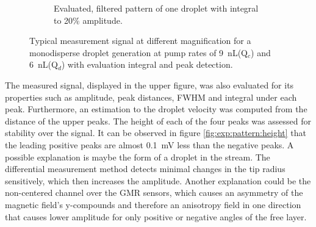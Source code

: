 \begin{figure}[h]
\begin{subfigure}[r]{.49\textwidth}
	\caption{Evaluated, filtered pattern of one droplet with integral to 20\% amplitude.}
	\label{fig:exp:pattern:raw}
\end{subfigure}
	\caption{Typical measurement signal at different magnification for a monodisperse droplet generation at pump rates of \SI{9}{\nano\liter}(Q$_c$) and \SI{6}{\nano\liter}(Q$_d$) with evaluation integral and peak detection.}
\end{figure}

The measured signal, displayed in the upper figure, was also evaluated for its properties such as amplitude, peak distances, FWHM and integral under each peak. Furthermore, an estimation to the droplet velocity was computed from the distance of the upper peaks. The height of each of the four peaks was assessed for stability over the signal. It can be observed in figure \ref{fig:exp:pattern:height} that the leading positive peaks are almost \SI{0.1}{\mV} less than the negative peaks. A possible explanation is maybe the form of a droplet in the stream. The differential measurement method detects minimal changes in the tip radius sensitively, which then increases the amplitude. Another explanation could be the non-centered channel over the GMR sensors, which causes an asymmetry of the magnetic field's y-compounds and therefore an anisotropy field in one direction that causes lower amplitude for only positive or negative angles of the free layer.

